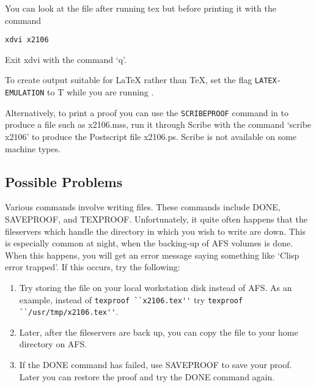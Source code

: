 \documentclass{article}
\begin{document}
You can look at the file after running tex but before printing it with the command
\begin{verbatim}
xdvi x2106
\end{verbatim}
Exit xdvi with the command `q'.

To create output suitable for LaTeX
rather than TeX, set the flag {\tt LATEX-EMULATION} to T while you are running {\ETPS}.

Alternatively, to print a proof
you can use the {\tt SCRIBEPROOF} command in {\ETPS} to produce a file
such as x2106.mss, run it through Scribe with the command `scribe x2106' to produce
the Postscript file x2106.ps. Scribe is not available on some machine types.

\subsection{Possible Problems}

Various {\ETPS} commands involve writing files.  These commands include
DONE, SAVEPROOF, and TEXPROOF.  Unfortunately, it quite often
happens that the fileservers which handle the directory in which you
wish to write are down.  This is especially common at night, when
the backing-up of AFS volumes is done.  When this happens, you will get
an error message saying something like `Clisp error trapped'.  If this occurs,
try the following:

\begin{enumerate}
\item Try storing the file on your local workstation disk instead of AFS.
As an example, instead of \newline
\verb=texproof ``x2106.tex''= \newline
try \newline
\verb=texproof ``/usr/tmp/x2106.tex''=.

\item Later, after the
fileservers are back up, you can copy the file to your home directory on AFS.

\item If the DONE command has failed, use SAVEPROOF to save your proof.
Later you can restore the proof and try the DONE command again.
\end{enumerate}
\end{document}
